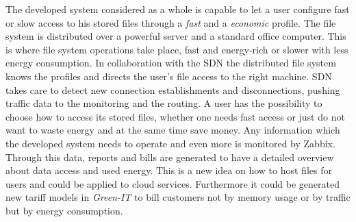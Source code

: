 \label{sec:conclusion}
The developed system considered as a whole is capable to let a user configure fast or slow access to his stored files through a \textit{fast} and a \textit{economic} profile. The file system is distributed over a powerful server and a standard office computer. This is where file system operations take place, fast and energy-rich or slower with less energy consumption. In collaboration with the SDN the distributed file system knows the profiles and directs the user's file access to the right machine. SDN takes care to detect new connection establishments and disconnections, pushing traffic data to the monitoring and the routing. A user has the possibility to choose how to access its stored files, whether one needs fast access or just do not want to waste energy and at the same time save money. Any information which the developed system needs to operate and even more is monitored by Zabbix. Through this data, reports and bills are generated to have a detailed overview about data access and used energy. This is a new idea on how to host files for users and could be applied to cloud services. Furthermore it could be generated new tariff models in \textit{Green-IT} to bill customers not by memory usage or by traffic but by energy consumption.
